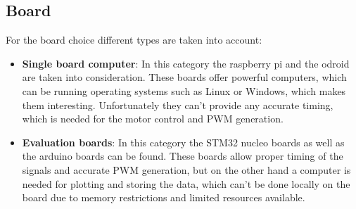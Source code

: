 \documentclass[12pt,a4paper, twoside]{article}
\begin{document}
\subsection{Board}
For the board choice different types are taken into account:
\begin{itemize}
	\item \textbf{Single board computer}: In this category the raspberry pi and the odroid are taken into consideration. These boards offer powerful computers, which can be running operating systems such as Linux or Windows, which makes them interesting. Unfortunately they can't provide any accurate timing,  which is needed for the motor control and PWM generation.
	\item \textbf{Evaluation boards}: In this category the STM32 nucleo boards as well as the arduino boards can be found. These boards allow proper timing of the signals and accurate PWM generation, but on the other hand a computer is needed for plotting and storing the data, which can't be done locally on the board due to memory restrictions and limited resources available.
\end{itemize}
\end{document}
